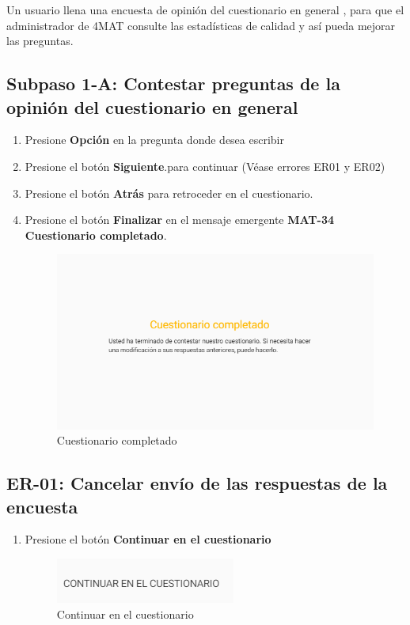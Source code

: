  Un usuario llena una encuesta de opinión del cuestionario en general , para que el administrador de 4MAT consulte las estadísticas de calidad
	y así pueda mejorar las preguntas.
  
  \subsection{Subpaso 1-A: Contestar preguntas de la opinión del cuestionario en general }
\begin{enumerate}
	\item Presione \textbf{Opción} en la pregunta donde desea escribir
	\item Presione el botón \textbf{Siguiente}.para continuar (Véase errores ER01 y ER02)
	\item Presione el botón \textbf{Atrás} para retroceder en el cuestionario.
	\item Presione el botón \textbf{Finalizar} en el mensaje emergente \textbf{MAT-34 Cuestionario completado}.
	\begin{figure}[hbtp]
	\includegraphics[scale=0.6]{images/Interfaz/MAT-34cuestionarioCompletado.png}
	\caption{Cuestionario completado}
	\end{figure}
\end{enumerate}

  \subsection{ER-01: Cancelar envío de las respuestas de la encuesta}
\begin{enumerate}
	\item Presione el botón \textbf{Continuar en el cuestionario}
  \begin{figure}[hbtp]
	\includegraphics[scale=0.3]{images/Interfaz/MAT-34continuar.png}
	\caption{Continuar en el cuestionario}
	\end{figure}
\end{enumerate}

  